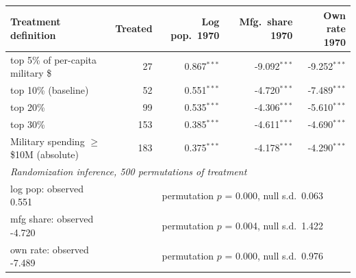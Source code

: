 \begin{tabular}{lrrrr}
\toprule
Treatment definition & Treated & Log pop.\ 1970 & Mfg.\ share 1970 & Own rate 1970 \\
\midrule
top 5\% of per-capita military \$ & 27 & 0.867$^{***}$ & -9.092$^{***}$ & -9.252$^{***}$ \\
top 10\% (baseline) & 52 & 0.551$^{***}$ & -4.720$^{***}$ & -7.489$^{***}$ \\
top 20\% & 99 & 0.535$^{***}$ & -4.306$^{***}$ & -5.610$^{***}$ \\
top 30\% & 153 & 0.385$^{***}$ & -4.611$^{***}$ & -4.690$^{***}$ \\
Military spending $\geq$ \$10M (absolute) & 183 & 0.375$^{***}$ & -4.178$^{***}$ & -4.290$^{***}$ \\
\midrule
\multicolumn{5}{l}{\emph{Randomization inference, 500 permutations of treatment}} \\
\quad log pop: observed 0.551 & & \multicolumn{3}{l}{permutation $p$ = 0.000, null s.d.\ 0.063} \\
\quad mfg share: observed -4.720 & & \multicolumn{3}{l}{permutation $p$ = 0.004, null s.d.\ 1.422} \\
\quad own rate: observed -7.489 & & \multicolumn{3}{l}{permutation $p$ = 0.000, null s.d.\ 0.976} \\
\bottomrule
\end{tabular}